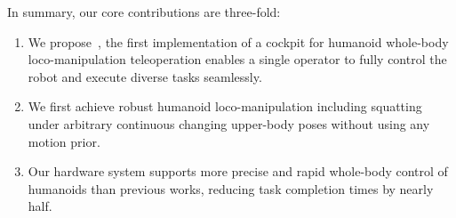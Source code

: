 In summary, our core contributions are three-fold:
\begin{enumerate}
    \item We propose~\ourshort, the first implementation of a cockpit for humanoid whole-body loco-manipulation teleoperation enables a single operator to fully control the robot and execute diverse tasks seamlessly.
    \item We first achieve robust humanoid loco-manipulation including squatting under arbitrary continuous changing upper-body poses without using any motion prior.
    \item Our hardware system supports more precise and rapid whole-body control of humanoids than previous works, reducing task completion times by nearly half.

\end{enumerate}